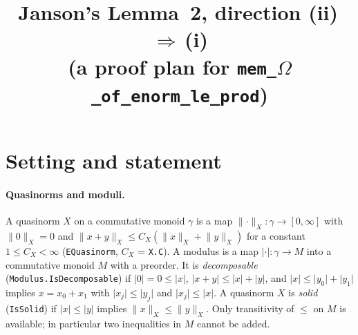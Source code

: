 \documentclass[11pt]{article}
\title{Janson's Lemma~2, direction (ii)\,\(\Rightarrow\)\,(i)\\
\large (a proof plan for \texttt{mem\_\(\Omega\)\_of\_enorm\_le\_prod})}
\date{}
\theoremstyle{definition}
\theoremstyle{remark}
\newcommand{\abs}[1]{\lvert #1\rvert}
\newcommand{\norm}[2]{\lVert #1\rVert_{#2}}
\begin{document}
\maketitle

\section{Setting and statement}

\paragraph{Quasinorms and moduli.}
A quasinorm \(X\) on a commutative monoid \(\gamma\) is a map
\(\norm{\cdot}{X}\colon \gamma \to [0,\infty]\) with \(\norm{0}{X} = 0\) and
\(\norm{x+y}{X} \le C_X(\norm{x}{X} + \norm{y}{X})\) for a constant \(1 \le C_X < \infty\)
(\texttt{EQuasinorm}, \(C_X\) = \texttt{X.C}). A modulus is a map
\(\abs{\cdot}\colon\gamma\to M\) into a commutative monoid \(M\) with a preorder. It is
\emph{decomposable} (\texttt{Modulus.IsDecomposable}) if \(\abs{0} = 0 \le \abs{x}\),
\(\abs{x+y} \le \abs{x} + \abs{y}\), and \(\abs{x} \le \abs{y_0} + \abs{y_1}\) implies
\(x = x_0 + x_1\) with \(\abs{x_j} \le \abs{y_j}\) and \(\abs{x_j} \le \abs{x}\). A quasinorm
\(X\) is \emph{solid} (\texttt{IsSolid}) if \(\abs{x} \le \abs{y}\) implies
\(\norm{x}{X} \le \norm{y}{X}\). Only transitivity of \(\le\) on \(M\) is available; in
particular two inequalities in \(M\) cannot be added.
\end{document}
